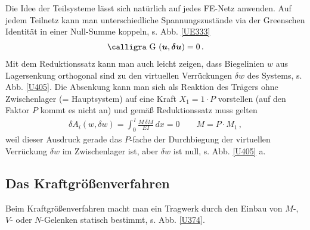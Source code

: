 {{{{{Die Idee der Teilsysteme l\"{a}sst sich nat\"{u}rlich auf jedes FE-Netz anwenden. Auf jedem Teilnetz kann man unterschiedliche Spannungszust\"{a}nde via der Greenschen Identit\"{a}t in einer Null-Summe koppeln, s.  Abb. \ref{UE333}
\begin{align}
\text{\normalfont\calligra G\,\,}(\vek u,\vek  \delta \vek u) = 0\,.
\end{align}
Mit dem Reduktionssatz kann man auch leicht zeigen, dass Biegelinien $w$ aus Lagersenkung orthogonal sind zu den virtuellen Verr\"{u}ckungen $\delta w$ des Systems, s. Abb. \ref{U405}. Die Absenkung kann man sich als Reaktion des Tr\"{a}gers ohne Zwischenlager (= Hauptsystem) auf eine Kraft $X_1 = 1 \cdot P$ vorstellen (auf den Faktor $P$ kommt es nicht an) und gem\"{a}{\ss} Reduktionssatz muss gelten
\begin{align}
\delta A_i(w, \delta w) = \int_0^{\,l} \frac{M\,\delta M}{EI}\,dx = 0 \qquad M = P \cdot M_1\,,
\end{align}
weil dieser Ausdruck gerade das $P$-fache der Durchbiegung der virtuellen Verr\"{u}ckung $\delta w$ im Zwischenlager ist, aber $\delta w$ ist null, s. Abb. \ref{U405} a.

{\textcolor{sectionTitleBlue}{\section{Das Kraftgr\"{o}{\ss}enverfahren}}}
Beim Kraftgr\"{o}{\ss}enverfahren macht man ein Tragwerk durch den Einbau von $M$-, $V$- oder $N$-Gelenken statisch bestimmt, s. Abb. \ref{U374}.

}}}}}
